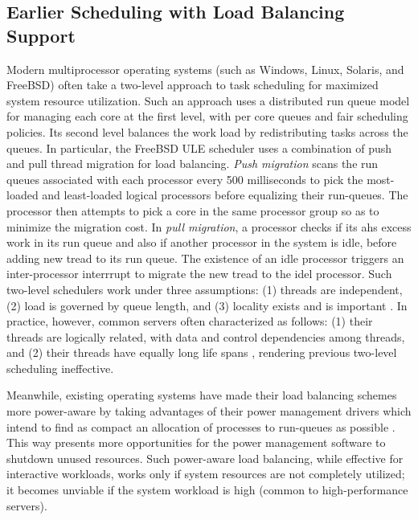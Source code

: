 \documentclass[times, 10pt,twocolumn]{IEEEtran}
\begin{document}
\subsection{Earlier Scheduling with Load Balancing Support}
\label{sec:therm-comp-workl}
Modern multiprocessor operating systems (such as Windows, Linux, Solaris,
and FreeBSD) often take a two-level approach to task scheduling for
maximized system resource utilization.
Such an approach uses a distributed run queue model for managing each core
at the first level, with per core queues and fair scheduling policies.
Its second level balances the work load by redistributing tasks across the queues.  
In particular, the FreeBSD ULE scheduler
\cite{Roberson2003,McKusick2004,McKusick2004b} uses a combination of
push and pull thread migration for load balancing. 
\textit{Push migration} scans the run queues associated with each processor
every 500 milliseconds to pick the most-loaded and least-loaded logical
processors before equalizing their run-queues. 
The processor then attempts to pick a core in the
same processor group so as to minimize the migration cost.
In \textit{pull migration}, a processor checks if its ahs excess work in
its run queue and also if another processor in the system is idle,
before adding new tread to its run queue.
The existence of an idle processor triggers an inter-processor interrrupt
to migrate the new tread to the idel processor.
Such two-level schedulers work under three assumptions:
(1) threads are independent, (2) load is governed by queue length,
and (3) locality exists and is important \cite{Hofmeyr2010}.
In practice, however, common servers often characterized as follows:
(1) their threads are logically related, with data and control dependencies among threads, 
and (2) their threads have equally long life spans \cite{Hofmeyr2010},
rendering previous two-level scheduling ineffective.

Meanwhile, existing operating systems have made their load balancing schemes
more power-aware by taking advantages of their power management drivers
which intend to find as compact an allocation
of processes to run-queues as possible \cite{Sun2009,Sun2009b,Xia2010,Sarood2011}.
This way presents more opportunities for the power management
software to shutdown unused resources. 
Such power-aware load balancing, while effective for interactive workloads,
works only if system resources are not completely utilized;
it becomes unviable if the system workload is high (common to high-performance servers).
\end{document}
